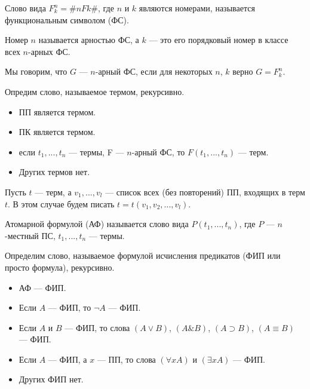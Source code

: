    \begin{Def}
        Слово вида $F_k^n = \#nFk\#$, где $n$ и $k$ являются номерами, называется функциональным символом (ФС).

         Номер $n$ называется арностью ФС, а $k$ --- это его порядковый номер в классе всех $n$-арных ФС.
    \end{Def}

    \begin{Rem}
        Мы говорим, что $G$ --- $n$-арный ФС, если для некоторых $n$, $k$ верно $G = F^n_k$.
    \end{Rem}

    \begin{Def}[Терм]
        Опредим слово, называемое термом, рекурсивно.
        \begin{itemize}
            \item ПП является термом.
            \item ПК является термом.
            \item если $t_1, ..., t_n$ --- термы, F --- $n$-арный ФС, то $F(t_1, ..., t_n)$ --- терм. 
            \item Других термов нет.
        \end{itemize}
    \end{Def}

    \begin{Rem}
        Пусть $t$ --- терм, а $v_1, ..., v_l$ --- список всех (без повторений) ПП, входящих в терм $t$. В этом случае будем писать $t = t(v_1, v_2, ..., v_l)$.
    \end{Rem}

    \begin{Def}
        Атомарной формулой (АФ) называется слово вида $P (t_1, ..., t_n)$, где $P$ --- $n$-местный ПС, $t_1, ..., t_n$ --- термы.
    \end{Def}

    \begin{Def}
        Определим слово, называемое формулой исчисления предикатов (ФИП или просто формула), рекурсивно.
        \begin{itemize}
            \item АФ --- ФИП.
            \item Если $A$ --- ФИП, то $\neg A$ --- ФИП.
            \item Если $A$ и $B$ --- ФИП, то слова $(A \vee B)$, $(A \& B)$, $(A \supset B)$, $(A \equiv B)$ --- ФИП.
            \item Если $A$ --- ФИП, а $x$ --- ПП, то слова $(\forall x A)$ и $(\exists x A)$ --- ФИП.
            \item Других ФИП нет.
        \end{itemize}
    \end{Def}

